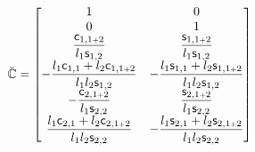 \documentclass[a4paper,11pt,brazil,fleqn]{article}
\begin{document}
\begin{itemize}
\begin{equation}
\breve{\mathbb{C}} =
\begin{bmatrix}
1 & 0 \\
0 & 1 \\
\displaystyle\frac{\mathsf{c}_{1,1{\scriptscriptstyle +} 2}}{l_1 \mathsf{s}_{1,2}} & \displaystyle\frac{\mathsf{s}_{1,1{\scriptscriptstyle +} 2}}{l_1 \mathsf{s}_{1,2}} \\
-\displaystyle\frac{l_1\mathsf{c}_{1,1} + l_2\mathsf{c}_{1,1{\scriptscriptstyle +} 2}}{l_1 l_2 \mathsf{s}_{1,2}} & -\displaystyle\frac{l_1\mathsf{s}_{1,1} + l_2\mathsf{s}_{1,1{\scriptscriptstyle +} 2}}{l_1 l_2 \mathsf{s}_{1,2}} \\
-\displaystyle\frac{\mathsf{c}_{2,1{\scriptscriptstyle +} 2}}{l_1 \mathsf{s}_{2,2}} & \displaystyle\frac{\mathsf{s}_{2,1{\scriptscriptstyle +} 2}}{l_1 \mathsf{s}_{2,2}} \\
\displaystyle\frac{l_1\mathsf{c}_{2,1} + l_2\mathsf{c}_{2,1{\scriptscriptstyle +} 2}}{l_1 l_2 \mathsf{s}_{2,2}} & -\displaystyle\frac{l_1\mathsf{s}_{2,1} + l_2\mathsf{s}_{2,1{\scriptscriptstyle +} 2}}{l_1 l_2 \mathsf{s}_{2,2}} \\
\end{bmatrix}
\end{equation}


\end{itemize}
\end{document}

